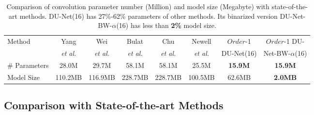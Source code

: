 \begin{table}[htb]
\begin{center}
\small
\caption{Comparison of convolution parameter number (Million) and model size (Megabyte) with state-of-the-art methods. DU-Net(16) has 27\%-62\% parameters of other methods. Its binarized version DU-Net-BW-$\alpha$(16) has less than {\bf 2\%} model size.}\label{tb:para-num}
\setlength\tabcolsep{0.5pt}
\begin{tabular}{lccccc|cc}
\toprule
\multirow{2}{*}{Method} & Yang  & Wei & Bulat  & Chu & Newell  & $Order$-1 & $Order$-1 DU-\\
& {\it et al.}\cite{yang2017learning} & {\it et al.}\cite{wei2016convolutional}  
& {\it et al.}\cite{bulat2016human} & {\it et al.}\cite{chu2017multi} & {\it et al.}\cite{newell2016stacked} & DU-Net(16) & Net-BW-$\alpha$(16)\\
\hline
\# Parameters & 28.0M & 29.7M & 58.1M & 58.1M & 25.5M & {\bf 15.9M} & {\bf 15.9M}\\
Model Size & 110.2MB & 116.9MB & 228.7MB & 228.7MB & 100.5MB & 62.6MB & {\bf 2.0MB}\\

\bottomrule
\end{tabular}
\end{center}
\end{table}

\subsection{Comparison with State-of-the-art Methods}


